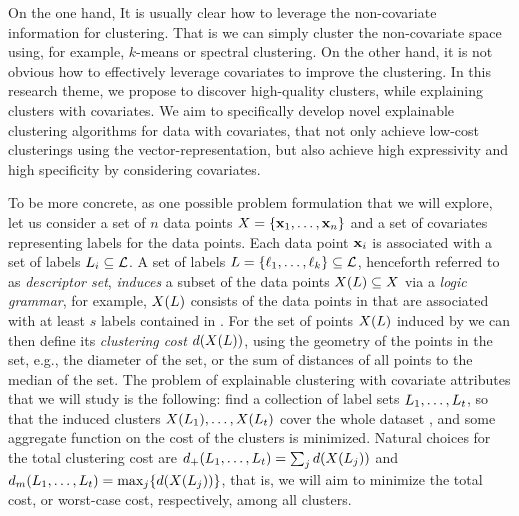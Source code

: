 \documentclass[a4paper,11pt]{article}
\begin{document}
On the one hand, It is usually clear how to leverage the non-covariate information for clustering.
That is we can simply cluster the non-covariate space using, for example, $k$-means or spectral clustering. 
On the other hand, it is not obvious how to effectively leverage 
covariates to improve the clustering. 
In this research theme, we propose to discover high-quality clusters, while explaining clusters with covariates. 
We aim to specifically develop novel explainable clustering algorithms for data with covariates,
that not only achieve low-cost clusterings using the vector-representation, but also achieve high expressivity and high specificity by considering covariates. 

To be more concrete, as one possible problem formulation that we will explore, 
let us consider a set of $n$ data points $X=\{\mathbf{x}_1,\ldots,\mathbf{x}_n\}$
and a set of covariates {} representing labels for the data points. 
Each data point $\mathbf{x}_i$ is associated with a set of labels ${L}_i\subseteq\mathcal{L}$. 
A set of labels ${L}=\{{\ell}_1,\ldots,{\ell}_k\}\subseteq\mathcal{L}$, 
henceforth referred to as \emph{descriptor set}, 
\emph{induces} a subset of the data points $X({L})\subseteq X$
via a \emph{logic grammar}, for example,  
$X({L})$ consists of the data points in \dataset that 
are associated with at least $s$ labels contained in .
For the set of points $X({L})$ induced by  
we can then define its \emph{clustering cost} $d(X({L}))$, 
using the geometry of the points in the set, 
e.g., the diameter of the set, or the sum of distances of all points to the median of the set.
The problem of explainable clustering with covariate attributes that we will study is the following: 
find a collection of label sets ${L}_1,\ldots,{L}_t$, 
so that the induced clusters $X({L}_1),\ldots,X({L}_t)$
cover the whole dataset \dataset, 
and some aggregate function on the cost of the clusters is minimized. 
Natural choices for the total clustering cost are
$d_{+}({L}_1,\ldots,{L}_t) = \sum_{j} d(X({L}_j))$ and 
$d_{m}({L}_1,\ldots,{L}_t) = \max_{j}\! \left\{ d(X({L}_j)) \right\}$, 
that is, we will aim to minimize the total cost, or worst-case cost, respectively, 
among all clusters. 
\end{document}
